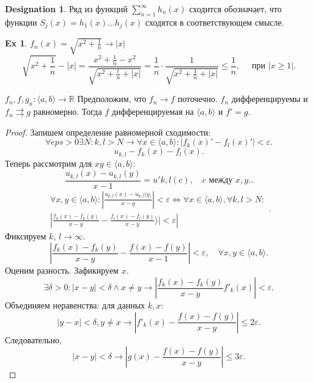 \documentclass[11pt]{book}
\newcommand{\R}{\mathbb{R}}
\newcommand{\slim}{\sum\limits}
\renewcommand{\le}{\leqslant}
\renewcommand{\ge}{\geqslant}
\theoremstyle{definition}
\theoremstyle{plain}
\theoremstyle{plain}
\theoremstyle{definition}
\newtheorem*{ex}{Ex}
\newtheorem*{name}{Designation}
\theoremstyle{remark}
\begin{document}
\begin{name}
    Ряд из функций $\slim_{n=1}^{\infty} h_n(x)$ сходится обозначает, что функции $S_j(x) = h_1(x) \ldots  h_j(x)$  сходятся в соответствующем смысле.
\end{name}
\begin{ex}
    $f_n(x) = \sqrt{x^2 + \frac{1}{n}} \to  |x|$
    \[
	\sqrt{x^2 + \frac{1}{n} }- |x| = \frac{x^2 + \frac{1}{n}  - x^2}{\sqrt{x^2 + \frac{t}{n} + |x|}} = \frac{1}{n }\cdot \frac{1}{\sqrt{x ^2 + \frac{1}{n} + |x|}} \le  \frac{1}{n}, \quad \text{ при } |x \ge  1|
    .\]
\end{ex}
\begin{thm}
    $f_n, f, g_n : \langle a, b \rangle  \to  \R$ Предположим, что $f_n \to  f$ поточечно.
    $f_n$ дифференцируемы и $f_n \rightrightarrows g$ равномерно. Тогда $f$  дифференцируемая на $\langle a, b \rangle$ и $f '= g$.
\end{thm}
\begin{proof}
    Запишем определение равномерной сходимости:
    \[
	\forall  eps >0 \exists  N : k, l > N \to  \forall  x \in  \langle a, b\rangle : |f_k(x) ' - f_l(x) '| < \varepsilon
    .\]
    \[
	u_{k, l} - f_k(x) - f_l(x)
    .\]
    Теперь рассмотрим для $x y \in  \langle a, b \rangle:$
    \[
	\frac{u_{k, l} (x)  - u_{k, l} (y)}{x-1} = u'{k,l}(c), \quad c \text{ между } x, y.
    .\]
    \[
	\begin{array}{r}
	    \forall x, y \in  \langle a, b \rangle : \left | \frac{u_{k, l} (x) - u_{k, l} (y_)}{x - y} \right | < \varepsilon  \Longleftrightarrow \forall  x \in  \langle a, b \rangle , \forall  k, l > N:\\
	    \left | \frac{f_k(x) - f_k(y) }{x-y} - \frac{f_l(x) - f_l(y)}{x-y} \rangle | < \varepsilon
	    \right |
	\end{array}
    .\]
    Фиксируем $k$, $l \to  \infty$.
    \[
	\left | \frac{f_k(x) - f_k(y)}{x - y} - \frac{f(x) - f(y)}{x-1} \right | < \varepsilon  , \quad \forall  x, y \in  \langle a, b \rangle
    .\]
    Оценим разность. Зафикируем $ x$.
    \[
	\exists  \delta  >0 : |x-y| < \delta  \wedge x \ne y\to  |\frac{f_k(x) - f_k(y)}{x-y} f'_k(x)|  < \varepsilon
    .\]
    Объединяем неравенства:
    для данных $ k, x$:
    \[
	|y - x| < \delta  , y \ne x \to  |f'_k(x) - \frac{f(x) - f(y)}{x-y}| \le  2 \varepsilon
    .\]
    Следовательно,
    \[
	|x - y| < \delta \to  |g(x) - \frac{f(x) - f(y)}{x-y}| \le 3 \varepsilon
    .\]
\end{proof}
\end{document}
